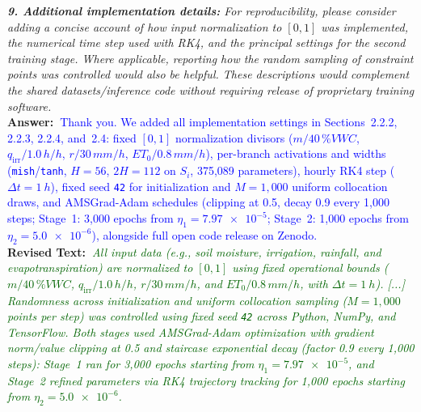 \documentclass[10pt]{article}
\newcommand{\query}[2][]{\ifthenelse{\equal{#1}{}}{}{\textbf{#1:}~}\emph{#2}}
\newcommand{\ans}[1]{\textbf{Answer:~}#1}
\newcommand{\Rtext}[1]{\textbf{Revised Text:~}#1}
\begin{document}
\query[R-2.9]{\textbf{9. Additional implementation details:} For reproducibility, please consider adding a concise account of how input normalization to $[0, 1]$ was implemented, the numerical time step used with RK4, and the principal settings for the second training stage. Where applicable, reporting how the random sampling of constraint points was controlled would also be helpful. These descriptions would complement the shared datasets/inference code without requiring release of proprietary training software.}\\
\ans{\textcolor{blue}{Thank you. We added all implementation settings in Sections~2.2.2, 2.2.3, 2.2.4, and~2.4: fixed $[0,1]$ normalization divisors ($m/40\,\si{\%VWC}$, $q_{\mathrm{irr}}/1.0\,\si{h/h}$, $r/30\,\si{mm/h}$, $ET_0/0.8\,\si{mm/h}$), per-branch activations and widths (\texttt{mish}/\texttt{tanh}, $H=56$, $2H=112$ on $S_i$, 375,089 parameters), hourly RK4 step ($\Delta t = \SI{1}{h}$), fixed seed \texttt{42} for initialization and $M=1{,}000$ uniform collocation draws, and AMSGrad-Adam schedules (clipping at 0.5, decay 0.9 every 1,000 steps; Stage~1: 3,000 epochs from $\eta_1 = \num{7.97e-5}$; Stage~2: 1,000 epochs from $\eta_2 = \num{5.0e-6}$), alongside full open code release on Zenodo.}}\\
\Rtext{\emph{\textcolor{darkgreen}{All input data (e.g., soil moisture, irrigation, rainfall, and evapotranspiration) are normalized to $[0, 1]$ using fixed operational bounds ($m/40\,\si{\%VWC}$, $q_{\mathrm{irr}}/1.0\,\si{h/h}$, $r/30\,\si{mm/h}$, and $ET_0/0.8\,\si{mm/h}$, with $\Delta t = \SI{1}{h}$). [...] Randomness across initialization and uniform collocation sampling ($M = 1{,}000$ points per step) was controlled using fixed seed \texttt{42} across Python, NumPy, and TensorFlow. Both stages used AMSGrad-Adam optimization with gradient norm/value clipping at 0.5 and staircase exponential decay (factor 0.9 every 1,000 steps): Stage~1 ran for 3,000 epochs starting from $\eta_1 = \num{7.97e-5}$, and Stage~2 refined parameters via RK4 trajectory tracking for 1,000 epochs starting from $\eta_2 = \num{5.0e-6}$.}}}
\end{document}
